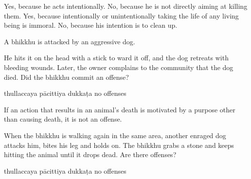 \begin{exam}{\autoExamName}
\begin{problem}
\bigskip

\begin{manswers}{1}
    \bChoices
     Yes, because he acts intentionally. \eAns
     No, because he is not directly aiming at killing them. \eAns
     Yes, because intentionally or unintentionally taking the life of any living being is immoral. \eAns
     No, because his intention is to clean up. \eAns
    \eChoices
\end{manswers}

\end{problem}

\problemDivide

\begin{problem*}

  A bhikkhu is attacked by an aggressive dog.

  \begin{parts}

    \item He hits it on the head with a stick to ward it off, and the dog retreats with bleeding wounds. Later, the owner complains to the community that the dog died. Did the bhikkhu commit an offense?

    \bigskip

    \begin{answers}{4}
      \bChoices
       thullaccaya \eAns
       pācittiya\eAns
       dukkaṭa\eAns
       no offenses\eAns
      \eChoices
    \end{answers}

    \begin{solution}
      If an action that results in an animal's death is motivated by a purpose other than causing death, it is not an offense.
    \end{solution}

    \ifnosolutions
    \bigskip
    \else
    \clearpage
    \fi

    \item When the bhikkhu is walking again in the same area, another enraged dog attacks him, bites his leg and holds on. The bhikkhu grabs a stone and keeps hitting the animal until it drops dead. Are there offenses?

    \bigskip

    \begin{answers}{4}
      \bChoices
       thullaccaya \eAns
       pācittiya\eAns
       dukkaṭa\eAns
       no offenses\eAns
      \eChoices
    \end{answers}


\end{parts}
\end{problem*}
\end{exam}
